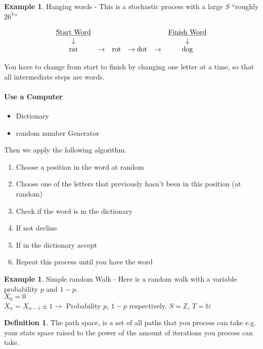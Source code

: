 \documentclass{article}
\theoremstyle{definition}
\newtheorem{defn}[thm]{Definition}
\newtheorem{ex}[thm]{Example}
\begin{document}
\begin{ex}
Hanging words - This is a stochastic process with a large $S$ ``roughly $26^3$''

\[
\begin{array}{ccccccc}
\mbox{\underline{Start Word}} & & & & & \mbox{\underline{Finish Word}} \\
\downarrow & & & & & \downarrow \\
\mbox{rat} & \rightarrow & \mbox{rot} & \rightarrow \mbox{dot} & \rightarrow & \mbox{dog}
\end{array}
\]

You have to change from start to finish by changing one letter at a time, so that all intermediate steps are words.
\end{ex}

\paragraph*{Use a Computer}

\begin{itemize}
\item
Dictionary
\item
random number Generator
\end{itemize}

Then we apply the following algorithm.

\begin{enumerate}
\item
Choose a position in the word at random
\item
Choose one of the letters that previously hasn't been in this position (at random)
\item
Check if the word is in the dictionary
\item
If not decline
\item
If in the dictionary accept
\item
Repeat this process until you have the word
\end{enumerate}

\begin{ex}Simple random Walk - Here is a random walk with a variable probability $p$ and $1-p$.\\

$X_0 = 0$\\
$X_n = X_{n-1} \pm 1 \rightarrow$ Probability $p$, $1-p$ respectively.
\indent $S = \mathbb{Z}$, $T = \mathbb{N}$
\end{ex}

\begin{defn} The path space, is a set of all paths that you process can take e.g. your state space raised to the power of the amount of iterations you process can take.
\end{defn}
\end{document}
